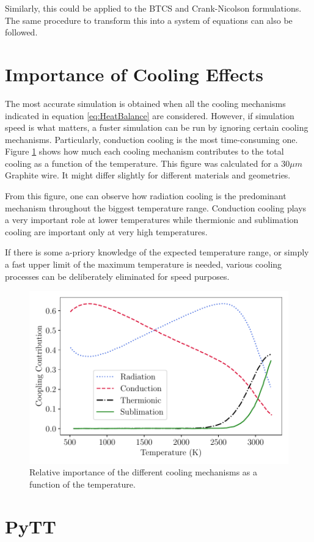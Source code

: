 Similarly, this could be applied to the BTCS and Crank-Nicolson formulations. The same procedure to transform this into a system of equations can also be followed. 

\section{Importance of Cooling Effects}

The most accurate simulation is obtained when all the cooling mechanisms indicated in equation \ref{eq:HeatBalance} are considered. However, if simulation speed is what matters, a fuster simulation can be run by ignoring certain cooling mechanisms. Particularly, conduction cooling is the most time-consuming one. Figure \ref{fig:CoolingComparison} shows how much each cooling mechanism contributes to the total cooling as a function of the temperature. This figure was calculated for a $30 \mu m$ Graphite wire. It might differ slightly for different materials and geometries. 

From this figure, one can observe how radiation cooling is the predominant mechanism throughout the biggest temperature range. Conduction cooling plays a very important role at lower temperatures while thermionic and sublimation cooling are important only at very high temperatures. 

If there is some a-priory knowledge of the expected temperature range, or simply a fast upper limit of the maximum temperature is needed, various cooling processes can be deliberately eliminated for speed purposes.

\begin{figure}[h]
    \centering
    \includegraphics[width=0.60\columnwidth]{PlotCoolingImportancfe/CoolingImpo.pdf}
    \caption{Relative importance of the different cooling mechanisms as a function of the temperature.}
    \label{fig:CoolingComparison}
\end{figure}

\section{PyTT}

